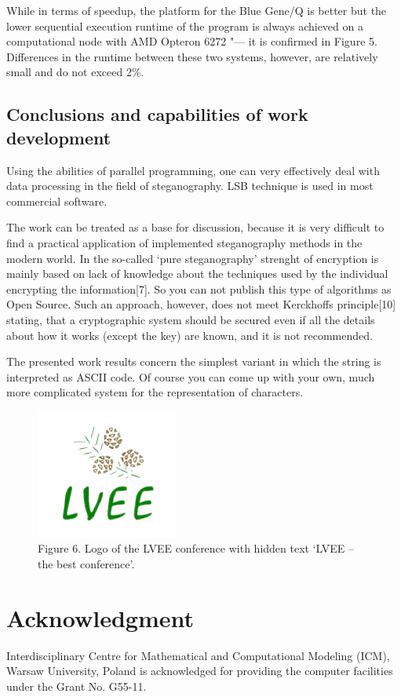 \documentclass[10pt, a5paper]{article}
\begin{document}
While in terms of speedup, the platform for the Blue Gene/Q is better but the lower sequential execution runtime of the program is always achieved on a computational node with AMD Opteron 6272 "--- it is confirmed in Figure 5. Differences in the runtime between these two systems, however, are relatively small and do not exceed 2\%.

\subsection*{Conclusions and capabilities of work development}

Using the abilities of parallel programming, one  can very effectively deal with data processing in the field of steganography. LSB technique is used in most commercial software.

The work can be treated as a base for discussion, because it is very difficult to find a practical application of implemented steganography methods in the modern world. In the so-called ‘pure steganography’ strenght of encryption is mainly based on lack of knowledge about the techniques used by the individual encrypting the information[7]. So you can not publish this type of algorithms as Open Source. Such an approach, however, does not meet Kerckhoffs principle[10] stating, that a cryptographic system should be secured even if all the details about how it works (except the key) are known, and it is not recommended.

The presented work results concern the simplest variant in which the string is interpreted as ASCII code. Of course you can come up with your own, much more complicated system for the representation of characters.

\begin{figure}[h!]
  \centering
    \includegraphics[scale=0.8]{103_2014_w_Kwiatkowska_lvee.png}\\
Figure 6. Logo of the LVEE conference with hidden text ‘LVEE – the best conference’.
\end{figure}

\section*{Acknowledgment}
Interdisciplinary Centre for Mathematical and Computational Mo\-deling (ICM), Warsaw University, Poland is acknowledged for providing the computer facilities under the Grant No. G55-11.
\end{document}
